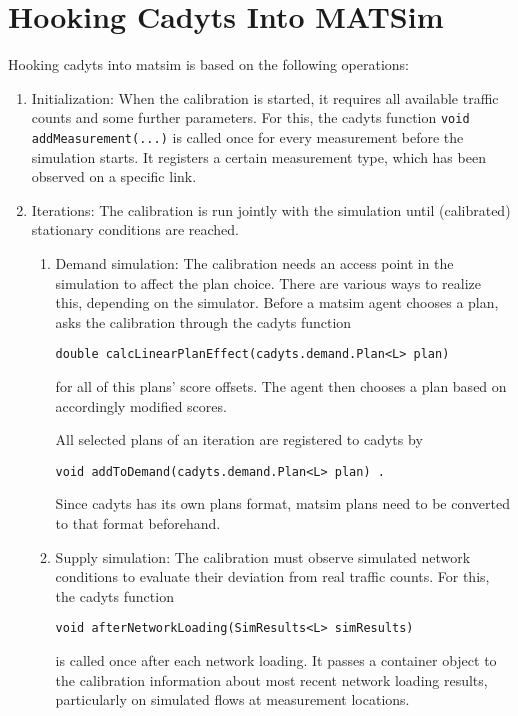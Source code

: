 \section{Hooking Cadyts Into MATSim}
Hooking \gls{cadyts} into \gls{matsim} is based on the following operations:
\begin{enumerate}\styleEnumerate
\item Initialization: When the calibration is started, it requires all available 
traffic counts and some further parameters. 
For this, the \gls{cadyts} function \lstinline|void addMeasurement(...)| is called once for every 
measurement\corr{,}{} before the simulation starts. It registers a certain
measurement type, which has been observed on a specific link.
\item Iterations: The calibration is run jointly with the simulation until (calibrated) 
stationary conditions are reached.
	\begin{enumerate}[label=\emph{\alph*})]

	\item Demand simulation: The calibration needs an access point in the simulation 
	to affect the plan choice. There are various ways to realize this, depending on the  
	simulator.	
	Before a \gls{matsim} agent chooses a plan,  asks the
	calibration through the \gls{cadyts} function
\begin{lstlisting}
double calcLinearPlanEffect(cadyts.demand.Plan<L> plan)
\end{lstlisting}
for all of this plans' score offsets.
    The agent then chooses a plan based on accordingly modified scores.

All selected plans of an iteration are registered to \gls{cadyts} by 
\begin{lstlisting}
void addToDemand(cadyts.demand.Plan<L> plan) .
\end{lstlisting}

Since \gls{cadyts} has its own plans format, \gls{matsim} plans need to be converted to that format beforehand.



	\item Supply simulation: The calibration must observe simulated network conditions 
  to evaluate their deviation from real traffic counts.
	For this, the \gls{cadyts} function %
\begin{lstlisting}
void afterNetworkLoading(SimResults<L> simResults)
\end{lstlisting}
is called once after each network loading. It passes a container object to the calibration
	 information about  most recent
	network loading results, particularly on simulated flows at measurement locations.


\end{enumerate}
\end{enumerate}
